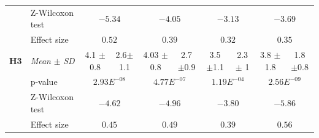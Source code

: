 \documentclass{llncs}
\begin{document}
\begin{table}[t]
{\begin{tabular}{|ll|c|c|c|c|c|c|c|c|}
					\newline & \multicolumn{1}{|l|}{Z-Wilcoxon test} & \multicolumn{2}{c|}{ $-5.34$} & \multicolumn{2}{c|}{ $-4.05$} & \multicolumn{2}{c|}{ $-3.13$}& \multicolumn{2}{c|}{ $-3.69$}\\
					\cline{2-10}	
					\newline & \multicolumn{1}{|l|}{Effect size} & \multicolumn{2}{c|}{ $0.52$} & \multicolumn{2}{c|}{ $0.39$} & \multicolumn{2}{c|}{ $0.32$}& \multicolumn{2}{c|}{ $0.35$}\\
					\hline	
					
					\newline \multirow{4}{*} {\textbf{H3}} &\multicolumn{1}{|l|}{ \textit{Mean} $\pm$ \textit{SD} } & 4.1 $\pm$ 0.8 & 2.6$\pm$ 1.1 & 4.03 $\pm$ 0.8 & 2.7 $\pm$0.9 &3.5 $\pm$1.1 & 2.3$\pm$ 1 & 3.8 $\pm$ 1.8 & 1.8 $\pm$0.8 \\
					\cline{2-10}	
					\newline & \multicolumn{1}{|l|}{p-value}  & \multicolumn{2}{c|}{ $2.93E^{-08}$} & \multicolumn{2}{c|}{ $4.77E^{-07}$} & \multicolumn{2}{c|}{ $1.19E^{-04}$}& \multicolumn{2}{c|}{ $2.56E^{-09}$}\\
					\cline{2-10}	
					\newline & \multicolumn{1}{|l|}{Z-Wilcoxon test} & \multicolumn{2}{c|}{ $-4.62$} & \multicolumn{2}{c|}{ $-4.96$} & \multicolumn{2}{c|}{ $-3.80$}& \multicolumn{2}{c|}{ $-5.86$}\\
					\cline{2-10}	
					\newline & \multicolumn{1}{|l|}{Effect size} & \multicolumn{2}{c|}{ $0.45$} & \multicolumn{2}{c|}{ $0.49$} & \multicolumn{2}{c|}{ $0.39$}& \multicolumn{2}{c|}{ $0.56$}\\
					\hline	
					

\end{tabular}}
\end{table}
\end{document}
